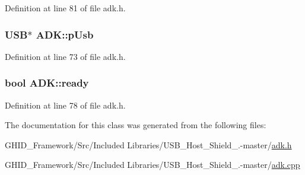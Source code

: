 \-Definition at line 81 of file adk.\-h.

\hypertarget{class_a_d_k_ab28e3a19569c27f3ed5362e9800065c1}{
\subsubsection[{p\-Usb}]{\setlength{\rightskip}{0pt plus 5cm}\-U\-S\-B$\ast$ {\bf \-A\-D\-K\-::p\-Usb}}}\label{class_a_d_k_ab28e3a19569c27f3ed5362e9800065c1}


\-Definition at line 73 of file adk.\-h.

\hypertarget{class_a_d_k_a135db75b9e8cdd59b89f46c44dd83dd4}{
\subsubsection[{ready}]{\setlength{\rightskip}{0pt plus 5cm}bool {\bf \-A\-D\-K\-::ready}}}\label{class_a_d_k_a135db75b9e8cdd59b89f46c44dd83dd4}


\-Definition at line 78 of file adk.\-h.



\-The documentation for this class was generated from the following files\-:\begin{DoxyCompactItemize}
\item 
\-G\-H\-I\-D\-\_\-\-Framework/\-Src/\-Included Libraries/\-U\-S\-B\-\_\-\-Host\-\_\-\-Shield\-\_.-\/master/\hyperlink{adk_8h}{adk.\-h}\item 
\-G\-H\-I\-D\-\_\-\-Framework/\-Src/\-Included Libraries/\-U\-S\-B\-\_\-\-Host\-\_\-\-Shield\-\_.-\/master/\hyperlink{adk_8cpp}{adk.\-cpp}\end{DoxyCompactItemize}
